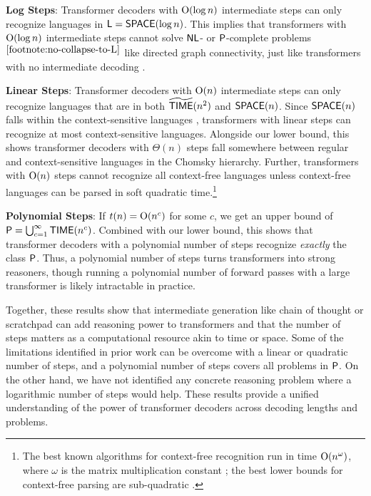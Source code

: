 \documentclass{article} %
\begin{document}
\begin{compactenum}
    \item \textbf{Log Steps}: Transformer decoders with $\O(\log n)$ intermediate steps can only recognize languages in $\L = \SPACE(\log n)$.
    This implies that transformers with $\O(\log n)$ intermediate steps cannot solve $\NL$- or $\P$-complete problems$^{\ref{footnote:no-collapse-to-L}}$ like directed graph connectivity, just like transformers with no intermediate decoding \citep{merrill2023parallelism}.
    
    \item \textbf{Linear Steps}: Transformer decoders with $\O(n)$ intermediate steps can only recognize languages that are in both $\tildeTIME(n^2)$ and $\SPACE(n)$. Since $\SPACE(n)$ falls within the context-sensitive languages \citep{kuroda1964classes}, transformers with linear steps can recognize at most context-sensitive languages. Alongside our lower bound, this shows transformer decoders with $\Theta(n)$ steps fall somewhere between regular and context-sensitive languages in the Chomsky hierarchy. Further, transformers with $\O(n)$ steps cannot recognize all context-free languages unless context-free languages can be parsed in soft quadratic time.\footnote{The best known algorithms for context-free recognition run in time $\O(n^\omega)$, where $\omega$ is the matrix multiplication constant \citep{valiant1975general}; the best lower bounds for context-free parsing are sub-quadratic \citep{lee2002fast}.}
    
    \item \textbf{Polynomial Steps}: If $t(n) = \O(n^c)$ for some $c$, we get an upper bound of $\P = \bigcup_{c=1}^\infty \TIME(n^c)$. Combined with our lower bound, this shows that transformer decoders with a polynomial number of steps recognize \emph{exactly} the class $\P$. Thus, a polynomial number of steps turns transformers into strong reasoners, though running a polynomial number of forward passes with a large transformer is likely intractable in practice.
\end{compactenum}

Together, these results show that intermediate generation like chain of thought or scratchpad can add reasoning power to transformers and that the number of steps matters as a computational resource akin to time or space. Some of the limitations identified in prior work \cite[][etc.]{merrill2023parallelism,chiang2023tighter} can be overcome with a linear or quadratic number of steps, and a polynomial number of steps covers all problems in $\P$. On the other hand, we have not identified any concrete reasoning problem where a logarithmic number of steps would help. These results provide a unified understanding of the power of transformer decoders across decoding lengths and problems.
\end{document}
